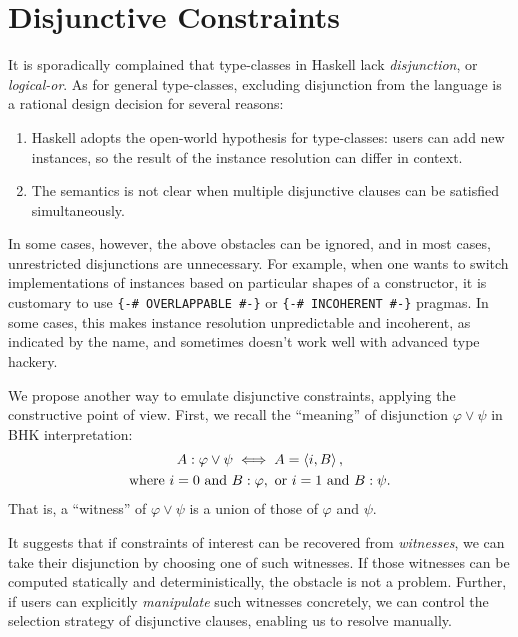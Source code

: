 \documentclass[demotion-paper.tex]{subfiles}
\begin{document}
\section{Disjunctive Constraints}\label{sec:disj}
It is sporadically complained that type-classes in Haskell lack \emph{disjunction}, or \emph{logical-or}.
As for general type-classes, excluding disjunction from the language is a rational design decision for several reasons:
\begin{enumerate}
  \item Haskell adopts the open-world hypothesis for type-classes: users can add new instances, so the result of the instance resolution can differ in context.
  \label{item:openness}
  \item The semantics is not clear when multiple disjunctive clauses can be satisfied simultaneously.
  \label{item:arb-choice}
\end{enumerate}
In some cases, however, the above obstacles can be ignored, and in most cases, unrestricted disjunctions are unnecessary.
For example, when one wants to switch implementations of instances based on particular shapes of a constructor, it is customary to use \verb!{-# OVERLAPPABLE #-}! or \verb!{-# INCOHERENT #-}! pragmas.
In some cases, this makes instance resolution unpredictable and incoherent, as indicated by the name, and sometimes doesn't work well with advanced type hackery.

We propose another way to emulate disjunctive constraints, applying the constructive point of view.
First, we recall the ``meaning'' of disjunction $\varphi \vee \psi$ in BHK interpretation:
\begin{gather*}
      A: \varphi \vee \psi \iff A = \braket{i, B},
    \\
    \text{where }
    i = 0 \text{ and } B: \varphi, \text{ or }
    i = 1 \text{ and } B: \psi.
\end{gather*}
That is, a ``witness'' of $\varphi \vee \psi$ is a union of those of $\varphi$ and $\psi$.

It suggests that if constraints of interest can be recovered from \emph{witnesses}, we can take their disjunction by choosing one of such witnesses.
If those witnesses can be computed statically and deterministically, the obstacle  is not a problem.
Further, if users can explicitly \emph{manipulate} such witnesses concretely, we can control the selection strategy of disjunctive clauses, enabling us to resolve  manually.
\end{document}
